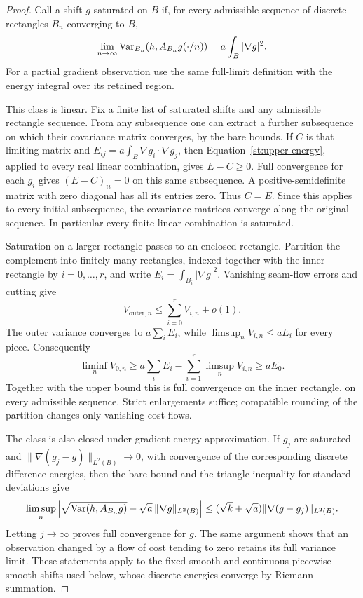\begin{proof}
Call a shift $g$ saturated on $B$ if, for every admissible sequence
of discrete rectangles $B_n$ converging to $B$,
\[
 \lim_{n\to\infty}\operatorname{Var}_{B_n}(h,A_{B_n}g(\cdot/n))
       =a\int_B|\nabla g|^2.
\]
For a partial gradient observation use the same full-limit definition
with the energy integral over its retained region.

This class is linear. Fix a finite list of saturated shifts and any
admissible rectangle sequence. From any subsequence one can extract a
further subsequence on which their covariance matrix converges, by the
bare bounds. If $C$ is that limiting matrix and
$E_{ij}=a\int_B\nabla g_i\cdot\nabla g_j$, then
Equation~\eqref{st:upper-energy}, applied to every real linear combination,
gives $E-C\ge0$. Full convergence for each $g_i$ gives
$(E-C)_{ii}=0$ on this same subsequence. A positive-semidefinite matrix
with zero diagonal has all its entries zero. Thus $C=E$.
Since this applies to every initial subsequence, the covariance matrices
converge along the original sequence. In particular every finite linear
combination is saturated.

Saturation on a larger rectangle passes to an enclosed rectangle.
Partition the complement into finitely many rectangles, indexed together
with the inner rectangle by $i=0,\ldots,r$, and write
$E_i=\int_{B_i}|\nabla g|^2$. Vanishing seam-flow errors and cutting give
\[
 V_{\mathrm{outer},n}\le\sum_{i=0}^rV_{i,n}+o(1).
\]
The outer variance converges to $a\sum_iE_i$, while
$\limsup_nV_{i,n}\le aE_i$ for every piece. Consequently
\[
 \liminf_nV_{0,n}
 \ge a\sum_iE_i-\sum_{i=1}^r\limsup_nV_{i,n}
 \ge aE_0.
\]
Together with the upper bound this is full convergence on the inner
rectangle, on every admissible sequence. Strict enlargements suffice;
compatible rounding of the partition changes only vanishing-cost flows.

The class is also closed under gradient-energy approximation. If
$g_j$ are saturated and $\|\nabla(g_j-g)\|_{L^2(B)}\to0$, with convergence
of the corresponding discrete difference energies, then the bare bound
and the triangle inequality for standard deviations give
\[
 \limsup_n\left|
 \sqrt{\operatorname{Var}(h,A_{B_n}g)}-\sqrt a\,\|\nabla g\|_{L^2(B)}
 \right|
 \le(\sqrt k+\sqrt a)\|\nabla(g-g_j)\|_{L^2(B)}.
\]
Letting $j\to\infty$ proves full convergence for $g$. The same argument
shows that an observation changed by a flow of cost tending to zero
retains its full variance limit. These statements apply to the fixed
smooth and continuous piecewise smooth shifts used below, whose discrete
energies converge by Riemann summation.


\end{proof}
